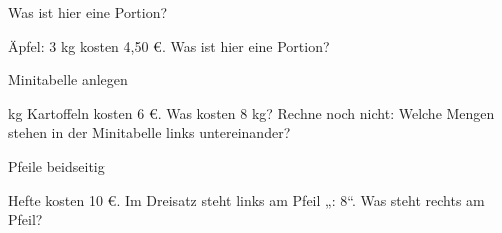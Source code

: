 \setcounter{aufgabe}{11}

\begin{aufgabe}{Was ist hier eine Portion?}
\begin{teile}
\teil Äpfel: 3 kg kosten 4,50 €. Was ist hier eine Portion?
\end{teile}
\end{aufgabe}

\begin{aufgabe}{Minitabelle anlegen}
\begin{teile}
 kg Kartoffeln kosten 6 €. Was kosten 8 kg? Rechne noch nicht: Welche Mengen stehen in der Minitabelle links untereinander?
\end{teile}
\end{aufgabe}

\begin{aufgabe}{Pfeile beidseitig}
\begin{teile}
 Hefte kosten 10 €. Im Dreisatz steht links am Pfeil „: 8“. Was steht rechts am Pfeil?
\end{teile}
\end{aufgabe}

